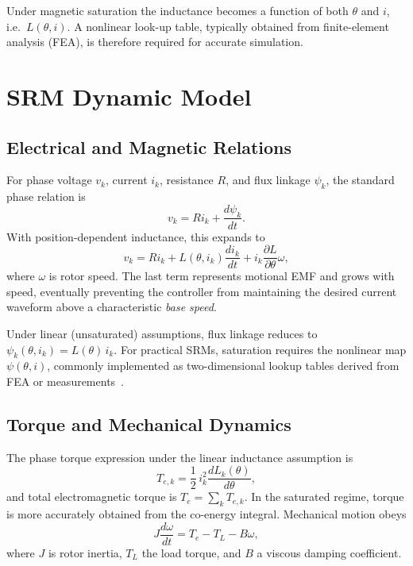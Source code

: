 \documentclass[conference]{IEEEtran}
\begin{document}
Under magnetic saturation the inductance becomes a function of both $\theta$ and $i$, i.e.\
$L(\theta, i)$. A nonlinear look-up table, typically obtained from finite-element analysis (FEA),
is therefore required for accurate simulation.

\section{SRM Dynamic Model}
\subsection{Electrical and Magnetic Relations}
For phase voltage $v_k$, current $i_k$, resistance $R$, and flux linkage $\psi_k$, the standard
phase relation is
\begin{equation}
v_k = R i_k + \frac{d\psi_k}{dt}.
\end{equation}
With position-dependent inductance, this expands to
\begin{equation}
v_k = R i_k + L(\theta, i_k)\frac{di_k}{dt} + i_k\frac{\partial L}{\partial \theta}\omega,
\label{eq:phase_voltage}
\end{equation}
where $\omega$ is rotor speed. The last term represents motional EMF and grows with speed,
eventually preventing the controller from maintaining the desired current waveform above a
characteristic \emph{base speed}.

Under linear (unsaturated) assumptions, flux linkage reduces to
$\psi_k(\theta, i_k) = L(\theta)\,i_k$.
For practical SRMs, saturation requires the nonlinear map $\psi(\theta, i)$, commonly implemented
as two-dimensional lookup tables derived from FEA or measurements~\cite{Krishnan2001}.

\subsection{Torque and Mechanical Dynamics}
The phase torque expression under the linear inductance assumption is
\begin{equation}
T_{e,k} = \frac{1}{2}\, i_k^2 \frac{dL_k(\theta)}{d\theta},
\end{equation}
and total electromagnetic torque is $T_e = \sum_k T_{e,k}$. In the saturated regime, torque is
more accurately obtained from the co-energy integral. Mechanical motion obeys
\begin{equation}
J\frac{d\omega}{dt} = T_e - T_L - B\omega,
\label{eq:mechanical}
\end{equation}
where $J$ is rotor inertia, $T_L$ the load torque, and $B$ a viscous damping coefficient.
\end{document}
